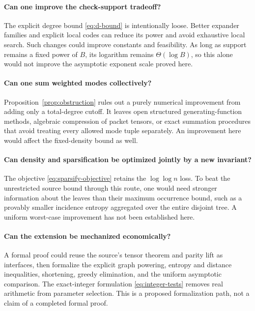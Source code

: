 \documentclass[11pt]{article}
\numberwithin{equation}{section}
\theoremstyle{definition}\newtheorem{definition}[theorem]{Definition}
\theoremstyle{remark}\newtheorem{remark}[theorem]{Remark}
\begin{document}
\paragraph{Can one improve the check-support tradeoff?}
The explicit degree bound \eqref{eq:d-bound} is intentionally loose.
Better expander families and explicit local codes can reduce its
power and avoid exhaustive local search. Such changes could improve
constants and feasibility. As long as support remains a fixed power
of $B$, its logarithm remains $\Theta(\log B)$, so this alone would
not improve the asymptotic exponent scale proved here.

\paragraph{Can one sum weighted modes collectively?}
Proposition~\ref{prop:obstruction} rules out a purely numerical
improvement from adding only a total-degree cutoff. It leaves open
structured generating-function methods, algebraic compression of
packet tensors, or exact summation procedures that avoid treating
every allowed mode tuple separately. An improvement here would
affect the fixed-density bound as well.

\paragraph{Can density and sparsification be optimized jointly by a new invariant?}
The objective \eqref{eq:sparsify-objective} retains the
$\log\log n$ loss. To beat the unrestricted source bound through
this route, one would need stronger information about the leaves
than their maximum occurrence bound, such as a provably smaller
incidence entropy aggregated over the entire disjoint tree. A
uniform worst-case improvement has not been established here.

\paragraph{Can the extension be mechanized economically?}
A formal proof could reuse the source's tensor theorem and parity
lift as interfaces, then formalize the explicit graph powering,
entropy and distance inequalities, shortening, greedy elimination,
and the uniform asymptotic comparison. The exact-integer formulation
\eqref{eq:integer-tests} removes real arithmetic from parameter
selection. This is a proposed formalization path, not a claim of a
completed formal proof.
\end{document}
